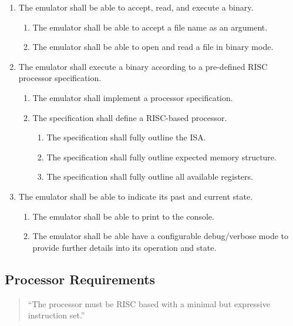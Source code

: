 \documentclass{article}
\begin{document}
\begin{enumerate}[label=R\arabic*]
    \item The emulator shall be able to accept, read, and execute a binary.
    \begin{enumerate}[label=\theenumi.\arabic*]
        \item The emulator shall be able to accept a file name as an argument.
        \item The emulator shall be able to open and read a file in binary mode.
    \end{enumerate}
    \item The emulator shall execute a binary according to a pre-defined RISC processor specification.
    \begin{enumerate}[label=\theenumi.\arabic*]
        \item The emulator shall implement a processor specification.
        \item The specification shall define a RISC-based processor.
        \begin{enumerate}[label=\theenumii.\arabic*]
            \item The specification shall fully outline the ISA.
            \item The specification shall fully outline expected memory structure.
            \item The specification shall fully outline all available registers.
        \end{enumerate}
    \end{enumerate}
    \item The emulator shall be able to indicate its past and current state.
    \begin{enumerate}[label=\theenumi.\arabic*]
        \item The emulator shall be able to print to the console.
        \item The emulator shall be able have a configurable debug/verbose mode to provide further details into its operation and state.
    \end{enumerate}
\end{enumerate}

\subsection{Processor Requirements}

\begin{quote}
    ``The processor must be RISC based with a minimal but expressive instruction set.''
\end{quote}
\end{document}
